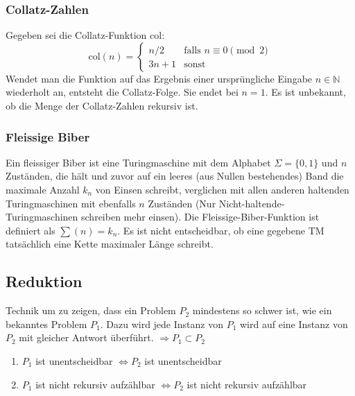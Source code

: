 \subsubsection{Collatz-Zahlen}
Gegeben sei die Collatz-Funktion col:
\begin{equation*}
	 \mbox{col}(n) = \begin{cases} n/2 &\text{falls } n \equiv 0 \pmod{2}\\ 3n+1 & \text{sonst}\end{cases}
\end{equation*}
Wendet man die Funktion auf das Ergebnis einer ursprüngliche Eingabe $n \in \mathbb{N}$ wiederholt an, entsteht die Collatz-Folge. Sie endet bei $n = 1$. Es ist unbekannt, ob die Menge der Collatz-Zahlen rekursiv ist.

\subsubsection{Fleissige Biber}
Ein fleissiger Biber ist eine Turingmaschine mit dem Alphabet $\Sigma = \{0, 1\}$ und $n$ Zuständen, die hält und zuvor auf ein leeres (aus Nullen bestehendes) Band die maximale Anzahl $k_n$ von Einsen schreibt, verglichen mit allen anderen haltenden Turingmaschinen mit ebenfalls $n$ Zuständen (Nur Nicht-haltende-Turingmaschinen schreiben mehr einsen).
Die Fleissige-Biber-Funktion ist definiert als $\sum(n) = k_n$. Es ist nicht entscheidbar, ob eine gegebene TM tatsächlich eine Kette maximaler Länge schreibt.

\subsection{Reduktion}
Technik um zu zeigen, dass ein Problem $P_2$ mindestens so schwer ist, wie ein bekanntes Problem $P_1$.
Dazu wird jede Instanz von $P_1$ wird auf eine Instanz von $P_2$ mit gleicher Antwort überführt. $\Rightarrow P_1 \subset P_2$
\begin{enumerate}\itemsep0em
	\item $P_1$ ist unentscheidbar $\Leftrightarrow P_2$ ist unentscheidbar
	\item $P_1$ ist nicht rekursiv aufzählbar $\Leftrightarrow P_2$ ist nicht rekursiv aufzählbar
\end{enumerate}


